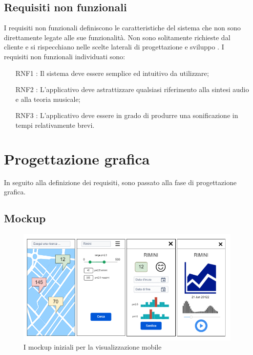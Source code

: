 \subsection{Requisiti non funzionali}
I requisiti non funzionali definiscono le caratteristiche del sistema che non sono direttamente legate alle sue funzionalità.
Non sono solitamente richieste dal cliente e si rispecchiano nelle scelte laterali di progettazione e sviluppo \cite{requisiti}.
I requisiti non funzionali individuati sono:
\begin{itemize}
    \item[RNF1]: Il sistema deve essere semplice ed intuitivo da utilizzare;
    \item[RNF2]: L'applicativo deve astrattizzare qualsiasi riferimento alla sintesi audio e alla teoria musicale;
    \item[RNF3]: L'applicativo deve essere in grado di produrre una sonificazione in tempi relativamente brevi.
\end{itemize}



\section{Progettazione grafica}
In seguito alla definizione dei requisiti, sono passato alla fase di progettazione grafica.
\subsection{Mockup}

\begin{figure}[h]
    \includegraphics[width=\linewidth]{img/mockup.png}
    \caption{I mockup iniziali per la visualizzazione mobile}
    \label{fig:mockup}
\end{figure}

